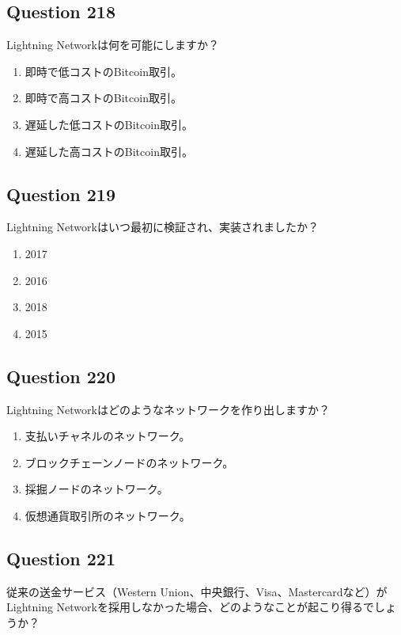 \documentclass[12pt,a4paper]{article}
\begin{document}
\bigskip


\subsection*{Question 218}
Lightning Networkは何を可能にしますか？

\begin{enumerate}[label=\Alph*., leftmargin=*]
\item 即時で低コストのBitcoin取引。
\item 即時で高コストのBitcoin取引。
\item 遅延した低コストのBitcoin取引。
\item 遅延した高コストのBitcoin取引。
\end{enumerate}

\bigskip


\subsection*{Question 219}
Lightning Networkはいつ最初に検証され、実装されましたか？

\begin{enumerate}[label=\Alph*., leftmargin=*]
\item 2017
\item 2016
\item 2018
\item 2015
\end{enumerate}

\bigskip


\subsection*{Question 220}
Lightning Networkはどのようなネットワークを作り出しますか？

\begin{enumerate}[label=\Alph*., leftmargin=*]
\item 支払いチャネルのネットワーク。
\item ブロックチェーンノードのネットワーク。
\item 採掘ノードのネットワーク。
\item 仮想通貨取引所のネットワーク。
\end{enumerate}

\bigskip


\subsection*{Question 221}
従来の送金サービス（Western Union、中央銀行、Visa、Mastercardなど）がLightning Networkを採用しなかった場合、どのようなことが起こり得るでしょうか？
\end{document}
